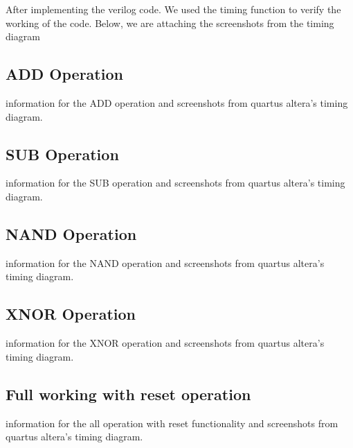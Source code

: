 After implementing the verilog code.
We used the timing function to verify the working of the code.
Below, we are attaching the screenshots from the timing diagram

\subsection{ADD Operation}\label{subsec:add-operation}

information for the ADD operation and screenshots from quartus altera's timing diagram.

\subsection{SUB Operation}\label{subsec:sub-operation}

information for the SUB operation and screenshots from quartus altera's timing diagram.

\subsection{NAND Operation}\label{subsec:nand-operation}

information for the NAND operation and screenshots from quartus altera's timing diagram.

\subsection{XNOR Operation}\label{subsec:xnor-operation}

information for the XNOR operation and screenshots from quartus altera's timing diagram.

\subsection{Full working with reset operation}\label{subsec:full-working-with-reset-operation}

information for the all operation with reset functionality and screenshots from quartus altera's timing diagram.
